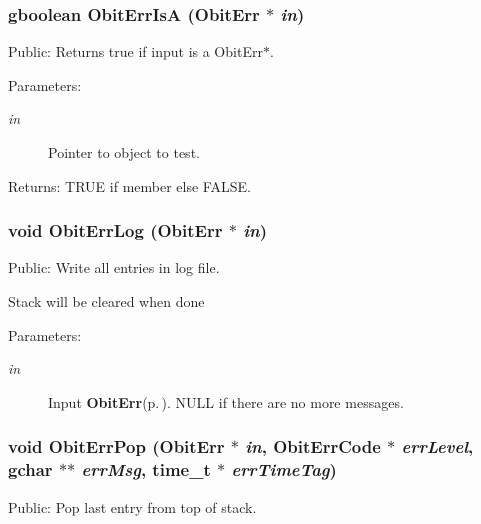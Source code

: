 \subsubsection{\setlength{\rightskip}{0pt plus 5cm}gboolean Obit\-Err\-Is\-A ({\bf Obit\-Err} $\ast$ {\em in})}\label{ObitErr_8c_a16}


Public: Returns true if input is a Obit\-Err$\ast$. 

\begin{Desc}
\item[Parameters:]
\begin{description}
\item[{\em in}]Pointer to object to test. \end{description}
\end{Desc}
\begin{Desc}
\item[Returns:]TRUE if member else FALSE. \end{Desc}
\subsubsection{\setlength{\rightskip}{0pt plus 5cm}void Obit\-Err\-Log ({\bf Obit\-Err} $\ast$ {\em in})}\label{ObitErr_8c_a13}


Public: Write all entries in log file. 

Stack will be cleared when done \begin{Desc}
\item[Parameters:]
\begin{description}
\item[{\em in}]Input {\bf Obit\-Err}{\rm (p.\,\pageref{structObitErr})}. NULL if there are no more messages. \end{description}
\end{Desc}
\subsubsection{\setlength{\rightskip}{0pt plus 5cm}void Obit\-Err\-Pop ({\bf Obit\-Err} $\ast$ {\em in}, {\bf Obit\-Err\-Code} $\ast$ {\em err\-Level}, gchar $\ast$$\ast$ {\em err\-Msg}, time\_\-t $\ast$ {\em err\-Time\-Tag})}\label{ObitErr_8c_a12}


Public: Pop last entry from top of stack. 

